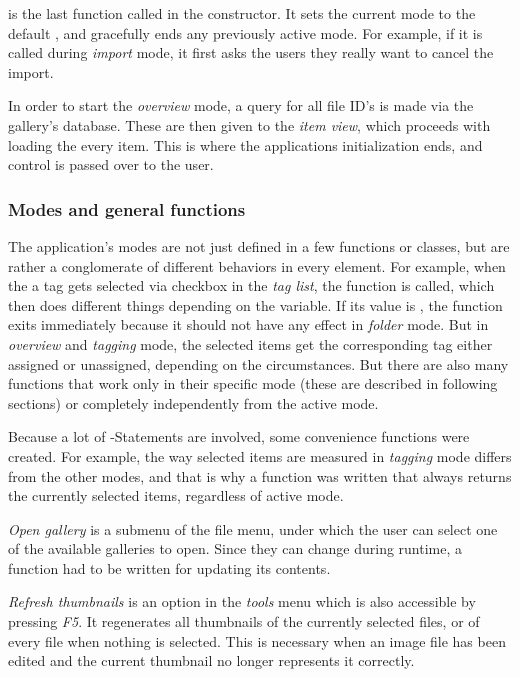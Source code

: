  is the last function called in the constructor. It sets the current mode
to the default , and gracefully ends any previously active
mode. For example, if it is called during \emph{import} mode, it first asks the users they really want to cancel the import.

In order to start the \emph{overview} mode, a query for all file ID's is made via the
gallery's database. These are then given to the \emph{item view}, which proceeds
with loading the every item. This is where the applications initialization
ends, and control is passed over to the user. 

\subsubsection{Modes and general functions}

The application's modes are not just defined in a few functions or classes, but are rather a conglomerate of 
different behaviors in every element. For example, when the a tag gets selected via checkbox in the \emph{tag list}, the function  is called, which then does different things depending on the  variable. If its value is , the function exits immediately because it should not have any effect in \emph{folder} mode. But in \emph{overview} and \emph{tagging} mode, the selected items get the corresponding tag either assigned or unassigned, depending on the circumstances. But there are also many functions that work only in their specific mode (these are described in following sections) or completely independently from the active mode.

Because a lot of -Statements are involved, some convenience functions were created. For example, the way selected items are measured in \emph{tagging} mode differs from the other modes, and that is why a function was written that always returns the currently selected items, regardless of active mode.

\emph{Open gallery} is a submenu of the file menu, under which the user can
select one of the available galleries to open. Since they can change during
runtime, a function had to be written for updating its contents.

\emph{Refresh thumbnails} is an option in the \emph{tools} menu which is also accessible by pressing \emph{F5}. It regenerates all thumbnails of the currently selected files, or of every file when nothing is selected. This is necessary when an image file has been edited and the current thumbnail no longer represents it correctly.

